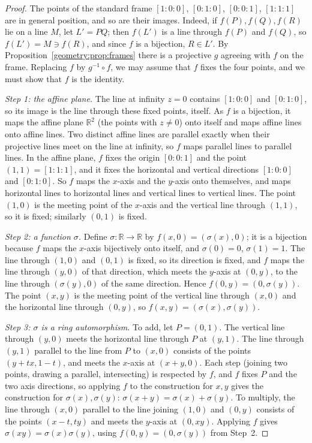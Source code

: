 \begin{proof}
The points of the standard frame $[1:0:0]$, $[0:1:0]$, $[0:0:1]$, $[1:1:1]$ are in general position, and so are their images. Indeed, if
$f(P),f(Q),f(R)$ lie on a line $M$, let $L'=PQ$; then $f(L')$ is a line through $f(P)$ and $f(Q)$, so $f(L')=M\ni f(R)$, and since $f$ is a
bijection, $R\in L'$. By Proposition~\ref{geometry:prop:frames} there is a
projective $g$ agreeing with $f$ on the frame. Replacing $f$ by $g^{-1}\circ f$, we may assume that $f$ fixes the four points, and we must show
that $f$ is the identity.

\emph{Step 1: the affine plane.} The line at infinity $z=0$ contains $[1:0:0]$ and $[0:1:0]$, so its image is the line through these fixed points,
itself. As $f$ is a bijection, it maps the affine plane $\mathbb R^2$ (the points with $z\ne0$) onto itself and maps affine lines onto affine lines.
Two distinct affine lines are parallel exactly when their projective lines meet on the line at infinity, so $f$ maps parallel lines to parallel
lines. In the affine plane, $f$ fixes the origin $[0:0:1]$ and the point $(1,1)=[1:1:1]$, and it fixes the horizontal and vertical directions
$[1:0:0]$ and $[0:1:0]$. So $f$ maps the $x$-axis and the $y$-axis onto themselves, and maps horizontal lines to horizontal lines and vertical lines
to vertical lines. The point $(1,0)$ is the meeting point of the $x$-axis and the vertical line through $(1,1)$, so it is fixed; similarly
$(0,1)$ is fixed.

\emph{Step 2: a function $\sigma$.} Define $\sigma:\mathbb R\to\mathbb R$ by $f(x,0)=(\sigma(x),0)$; it is a bijection because $f$ maps the
$x$-axis bijectively onto itself, and $\sigma(0)=0$, $\sigma(1)=1$. The line through $(1,0)$ and $(0,1)$ is fixed, so its direction is fixed, and
$f$ maps the line through $(y,0)$ of that direction, which meets the $y$-axis at $(0,y)$, to the line through $(\sigma(y),0)$ of the same direction.
Hence $f(0,y)=(0,\sigma(y))$. The point $(x,y)$ is the meeting point of the vertical line through $(x,0)$ and the horizontal line through $(0,y)$,
so $f(x,y)=(\sigma(x),\sigma(y))$.

\emph{Step 3: $\sigma$ is a ring automorphism.} To add, let $P=(0,1)$. The vertical line through $(y,0)$ meets the horizontal line through $P$ at
$(y,1)$. The line through $(y,1)$ parallel to the line from $P$ to $(x,0)$ consists of the points $(y+tx,1-t)$, and meets the $x$-axis at
$(x+y,0)$. Each step (joining two points, drawing a parallel, intersecting) is respected by $f$, and $f$ fixes $P$ and the two axis directions,
so applying $f$ to the construction for $x,y$ gives the construction for $\sigma(x),\sigma(y)$: $\sigma(x+y)=\sigma(x)+\sigma(y)$. To multiply,
the line through $(x,0)$ parallel to the line joining $(1,0)$ and $(0,y)$ consists of the points $(x-t,ty)$ and meets the $y$-axis at $(0,xy)$.
Applying $f$ gives $\sigma(xy)=\sigma(x)\sigma(y)$, using $f(0,y)=(0,\sigma(y))$ from Step~2.


\end{proof}
